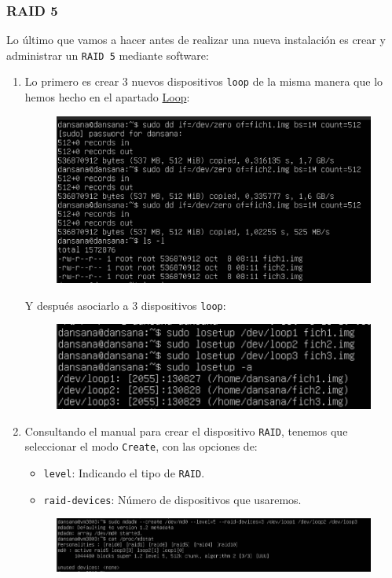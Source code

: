 \documentclass[10pt]{article}
\begin{document}
	\subsubsection{RAID 5}
	Lo último que vamos a hacer antes de realizar una nueva instalación es crear y administrar un \verb|RAID 5| mediante software:
	\begin{enumerate}
		\item Lo primero es crear 3 nuevos dispositivos \verb|loop| de la misma manera que lo hemos hecho en el apartado \hyperref[sec:loop]{Loop}:
		\begin{figure}[H]
			\setlength{\abovecaptionskip}{0cm}
			\setlength{\belowcaptionskip}{0cm}
			\centering
			\includegraphics[width=0.6\linewidth]{Recursos/fichRAID.png}
		\end{figure}
		Y después asociarlo a 3 dispositivos \verb|loop|:
		\begin{figure}[H]
			\setlength{\abovecaptionskip}{0cm}
			\setlength{\belowcaptionskip}{0cm}
			\centering
			\includegraphics[width=0.7\linewidth]{Recursos/loopRAID.png}
		\end{figure}
		\item Consultando el manual para crear el dispositivo \verb|RAID|, tenemos que seleccionar el modo \verb|Create|, con las opciones de:
		\begin{itemize}
			\item \verb|level|: Indicando el tipo de \verb|RAID|.
			\item \verb|raid-devices|: Número de dispositivos que usaremos.
		\end{itemize}
		\begin{figure}[H]
			\setlength{\abovecaptionskip}{0cm}
			\setlength{\belowcaptionskip}{0cm}
			\centering
			\includegraphics[width=0.9\linewidth]{Recursos/createRAID.png}

\end{figure}
\end{enumerate}
\end{document}
